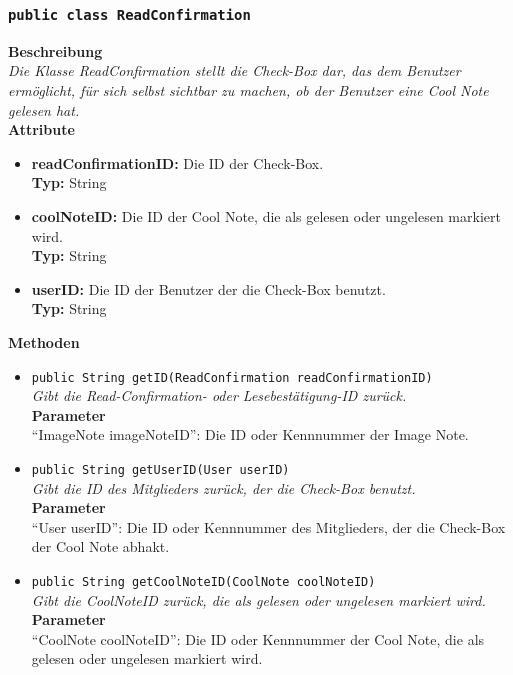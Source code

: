\subsubsection{\texttt{public class ReadConfirmation}}

	\textbf{Beschreibung} \\
	\textit{Die Klasse ReadConfirmation stellt die Check-Box dar, das dem Benutzer ermöglicht, für sich selbst sichtbar zu machen, ob der Benutzer eine Cool Note gelesen hat.} \\
	
	\textbf{Attribute}
	\begin{itemize}
		\item \textbf{readConfirmationID:} Die ID der Check-Box. \\
		\textbf{Typ:} String
		\item \textbf{coolNoteID:} Die ID der Cool Note, die als gelesen oder ungelesen markiert wird. \\
		\textbf{Typ:} String
		\item \textbf{userID:} Die ID der Benutzer der die Check-Box benutzt. \\
		\textbf{Typ:} String
	\end{itemize}
	
	\textbf{Methoden}
	\begin{itemize}
		\item\texttt{{public String getID(ReadConfirmation readConfirmationID)}}\\
		\textit{Gibt die Read-Confirmation- oder Lesebestätigung-ID zurück.}\\
		\textbf{Parameter}\\
		“ImageNote imageNoteID”: Die ID oder Kennnummer der Image Note.\\
		
		\item\texttt{{public String getUserID(User userID)}}\\
		\textit{Gibt die ID des Mitglieders zurück, der die Check-Box benutzt.}\\
		\textbf{Parameter}\\
		“User userID”: Die ID oder Kennnummer des Mitglieders, der die Check-Box der Cool Note abhakt.\\
		
		\item\texttt{{public String getCoolNoteID(CoolNote coolNoteID)}}\\
		\textit{Gibt die CoolNoteID zurück, die als gelesen oder ungelesen markiert wird.}\\
		\textbf{Parameter}\\
		“CoolNote coolNoteID”: Die ID oder Kennnummer der Cool Note, die als gelesen oder ungelesen markiert wird.\\
	\end{itemize}
